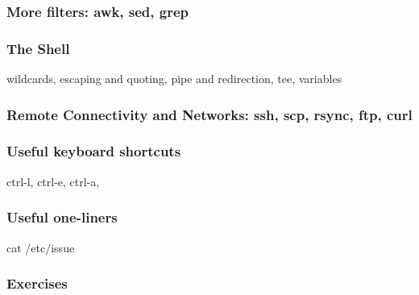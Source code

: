 \documentclass[hyperref={pdfpagelabels=false},12pt]{beamer}
\begin{document}
\begin{frame}
\frametitle{More filters: awk, sed, grep}
\end{frame}

\begin{frame}
\frametitle{The Shell}

wildcards, escaping and quoting, pipe and redirection, tee, variables
\end{frame}

\begin{frame}
\frametitle{Remote Connectivity and Networks: ssh, scp, rsync, ftp, curl}

\end{frame}

\begin{frame}
\frametitle{Useful keyboard shortcuts}

ctrl-l, ctrl-e, ctrl-a, 
\end{frame}

\begin{frame}
\frametitle{Useful one-liners}

cat /etc/issue
\end{frame}

\begin{frame}
\frametitle{Exercises}
\end{frame}
\end{document}
